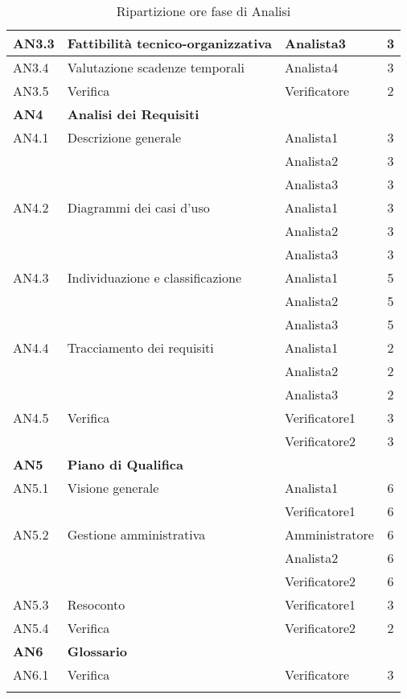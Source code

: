 \begin{longtable}{|l|l|l|c|}
      	{AN3.3} & {Fattibilità tecnico-organizzativa} & Analista3  & 3 \\
      	\hline
      	{AN3.4} & {Valutazione scadenze temporali} & Analista4  & 3 \\
      	\hline
      	{AN3.5} & {Verifica} & Verificatore  & 2 \\
      \hline
      \textbf{AN4} & \textbf{Analisi dei Requisiti} & &  \\
         \hline
         {AN4.1} & {Descrizione generale} & Analista1  &  3\\
         & & Analista2 & 3\\
         & & Analista3 & 3\\
         \hline
         {AN4.2} & {Diagrammi dei casi d'uso} & Analista1  &  3\\
         & & Analista2 & 3\\
         & & Analista3 & 3\\
         \hline
         {AN4.3} & {Individuazione e classificazione} & Analista1  &  5\\
         & & Analista2 & 5\\
         & & Analista3 & 5\\
         \hline
         {AN4.4} & {Tracciamento dei requisiti} & Analista1  &  2\\
         & & Analista2 & 2\\
         & & Analista3 & 2\\
         \hline
         {AN4.5} & {Verifica} & Verificatore1  &  3\\
         & & Verificatore2 & 3\\
     \hline
     \textbf{AN5} & \textbf{Piano di Qualifica} & &  \\
         \hline
         {AN5.1} & {Visione generale} & Analista1 &  6 \\
         & & Verificatore1 & 6\\
         \hline
         {AN5.2} & {Gestione amministrativa} & Amministratore  &  6\\
         & & Analista2 & 6\\
         & & Verificatore2 & 6\\
         \hline
         {AN5.3} & {Resoconto} & Verificatore1 &  3\\
         \hline
         {AN5.4} & {Verifica} & Verificatore2 &  2 \\
     \hline
     \textbf{AN6} & \textbf{Glossario} & &  \\
         \hline
         {AN6.1} & {Verifica} & Verificatore &  3 \\
         \hline
     \caption{Ripartizione ore fase di Analisi}
\end{longtable}
\egroup
  
